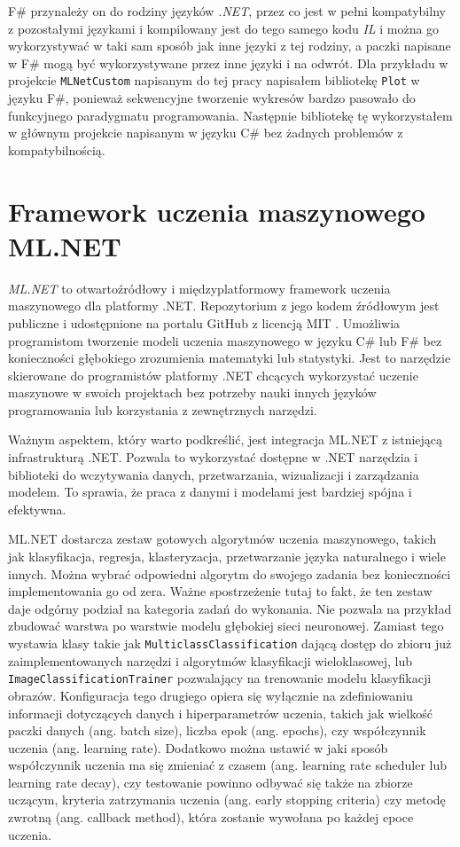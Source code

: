 F\# przynależy on do rodziny języków \emph{.NET}, przez co jest w pełni kompatybilny z pozostałymi językami i kompilowany jest do tego samego kodu \emph{IL} i można go wykorzystywać w taki sam sposób jak inne języki z tej rodziny, a paczki napisane w F\# mogą być wykorzystywane przez inne języki i na odwrót.
Dla przykładu w projekcie \lstinline{MLNetCustom} napisanym do tej pracy napisałem bibliotekę \lstinline{Plot} w języku F\#, ponieważ sekwencyjne tworzenie wykresów bardzo pasowało do funkcyjnego paradygmatu programowania.
Następnie bibliotekę tę wykorzystałem w głównym projekcie napisanym w języku C\# bez żadnych problemów z kompatybilnością.

\section{Framework uczenia maszynowego ML.NET}
\label{sec:ml-net}

\emph{ML.NET} to otwartoźródłowy i międzyplatformowy framework uczenia maszynowego dla platformy .NET.
Repozytorium z jego kodem źródłowym jest publiczne i udostępnione na portalu GitHub z licencją MIT \cite{dotnet-machinelearning-repo}.
Umożliwia programistom tworzenie modeli uczenia maszynowego w języku C\# lub F\# bez konieczności głębokiego zrozumienia matematyki lub statystyki.
Jest to narzędzie skierowane do programistów platformy .NET chcących wykorzystać uczenie maszynowe w swoich projektach bez potrzeby nauki innych języków programowania lub korzystania z zewnętrznych narzędzi.

Ważnym aspektem, który warto podkreślić, jest integracja ML.NET z istniejącą infrastrukturą .NET.
Pozwala to wykorzystać dostępne w .NET narzędzia i biblioteki do wczytywania danych, przetwarzania, wizualizacji i zarządzania modelem.
To sprawia, że praca z danymi i modelami jest bardziej spójna i efektywna.

ML.NET dostarcza zestaw gotowych algorytmów uczenia maszynowego, takich jak klasyfikacja, regresja, klasteryzacja, przetwarzanie języka naturalnego i wiele innych.
Można wybrać odpowiedni algorytm do swojego zadania bez konieczności implementowania go od zera.
Ważne spostrzeżenie tutaj to fakt, że ten zestaw daje odgórny podział na kategoria zadań do wykonania.
Nie pozwala na przykład zbudować warstwa po warstwie modelu głębokiej sieci neuronowej.
Zamiast tego wystawia klasy takie jak \lstinline{MulticlassClassification} dającą dostęp do zbioru już zaimplementowanych narzędzi i algorytmów klasyfikacji wieloklasowej, lub \lstinline{ImageClassificationTrainer} pozwalający na trenowanie modelu klasyfikacji obrazów.
Konfiguracja tego drugiego opiera się wyłącznie na zdefiniowaniu informacji dotyczących danych i hiperparametrów uczenia, takich jak wielkość paczki danych (ang. batch size), liczba epok (ang. epochs), czy współczynnik uczenia (ang. learning rate).
Dodatkowo można ustawić w jaki sposób współczynnik uczenia ma się zmieniać z czasem (ang. learning rate scheduler lub learning rate decay), czy testowanie powinno odbywać się także na zbiorze uczącym, kryteria zatrzymania uczenia (ang. early stopping criteria) czy metodę zwrotną (ang. callback method), która zostanie wywołana po każdej epoce uczenia.

